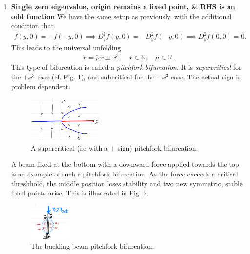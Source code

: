 \begin{enumerate}
	\item \textbf{Single zero eigenvalue, origin remains a fixed point, \& RHS is an odd function} 
		We have the same setup as previously, with the additional condition that
		\begin{align}
			f(y,0) = - f(-y,0)\implies D^2_{y}f(y,0) = -D^2_{y}f(-y,0) \implies D^2_{y}f(0,0) = 0.
		\end{align}
	This leads to the universal unfolding 
	\begin{align}
		\dot{x} = \tilde{\mu } x \pm x^3;\quad x \in \mathbb{R};\quad \mu \in \mathbb{R}.
	\end{align}
	This type of bifurcation is called a \emph{pitchfork bifurcation}. It is \emph{supercritical} for the $+x^3$ case (cf. Fig. \ref{fig:pitchfork_bif}), and subcritical for the $-x^3$ case. The actual sign is problem dependent.
\begin{figure}[h!]
	\centering
	\includegraphics[width=0.35\textwidth]{figures/ch3/16pitchfork_bif_A.png}
	\caption{A supercritical (i.e with a $+$ sign) pitchfork bifurcation.}
	\label{fig:pitchfork_bif}
\end{figure}

\begin{ex}
	A beam fixed at the bottom with a downward force applied towards the top is an example of such a pitchfork bifurcation. As the force exceeds a critical threshhold, the middle position loses stability and two new symmetric, stable fixed points arise. This is illustrated in Fig. \ref{fig:buckling_beam}.
	\begin{figure}[h!]
		\centering
		\includegraphics[width=0.2\textwidth]{figures/ch3/16buckling_beam_bif.png}
		\caption{The buckling beam pitchfork bifurcation.}
		\label{fig:buckling_beam}
	\end{figure}
	
\end{ex}


\end{enumerate}

